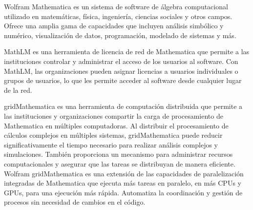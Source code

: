 \begin{doublespace}
\begin{multicols}{2}
    Wolfram Mathematica es un sistema de software de álgebra computacional utilizado en matemáticas, física, ingeniería, ciencias sociales y otros campos. Ofrece una amplia gama de capacidades que incluyen análisis simbólico y numérico, visualización de datos, programación, modelado de sistemas y más. \cite{Wolfram-mathematica-1}
    
    MathLM es una herramienta de licencia de red de Mathematica que permite a las instituciones controlar y administrar el acceso de los usuarios al software. Con MathLM, las organizaciones pueden asignar licencias a usuarios individuales o grupos de usuarios, lo que les permite acceder al software desde cualquier lugar de la red. \cite{Wolfram-mathlm-1}
    
    gridMathematica es una herramienta de computación distribuida que permite a las instituciones y organizaciones compartir la carga de procesamiento de Mathematica en múltiples computadoras. Al distribuir el procesamiento de cálculos complejos en múltiples sistemas, gridMathematica puede reducir significativamente el tiempo necesario para realizar análisis complejos y simulaciones. También proporciona un mecanismo para administrar recursos computacionales y asegurar que las tareas se distribuyan de manera eficiente. Wolfram gridMathematica es una extensión de las capacidades de paralelización integradas de Mathematica que ejecuta más tareas en paralelo, en más CPUs y GPUs, para una ejecución más rápida. Automatiza la coordinación y gestión de procesos sin necesidad de cambios en el código. \cite{Wolfram-grid-1}

  \end{multicols}

  \mylinespacing
  \mylinespacing
  \begin{tightcenter}
  \end{tightcenter}
\end{doublespace}